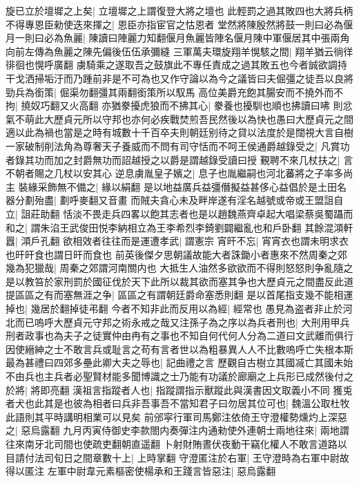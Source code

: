 旋已立於壇墀之上矣|{
	立壇墀之上謂復登大將之壇也}
此輕罰之過其敗四也大將兵柄不得專恩臣勑使迭來揮之|{
	恩臣亦指宦官之怙恩者}
堂然將陳殷然將鼓一則曰必為偃月一則曰必為魚麗|{
	陳讀曰陣麗力知翻偃月魚麗皆陣名偃月陳中軍偃居其中張兩角向前左傳為魚麗之陳先偏後伍伍承彌縫}
三軍萬夫環旋翔羊愰駭之間|{
	翔羊猶云徜徉徘徊也愰呼廣翻}
虜騎乘之遂取吾之鼓旗此不專任責成之過其敗五也今者誠欲調持干戈洒掃垢汙而乃踵前非是不可為也又作守論以為今之議皆曰夫倔彊之徒吾以良將勁兵為銜策|{
	倔渠勿翻彊其兩翻銜策所以馭馬}
高位美爵充飽其腸安而不撓外而不拘|{
	撓奴巧翻又火高翻}
亦猶豢擾虎狼而不拂其心|{
	豢養也擾馴也順也拂讀曰咈}
則忿氣不萌此大歷貞元所以守邦也亦何必疾戰焚煎吾民然後以為快也愚曰大歷貞元之間適以此為禍也當是之時有城數十千百卒夫則朝廷别待之貸以法度於是闊視大言自樹一家破制削法角為尊奢天子養威而不問有司守恬而不呵王侯通爵越錄受之|{
	凡賞功者錄其功而加之封爵無功而詔越授之以爵是謂越錄受讀曰授}
覲聘不來几杖扶之|{
	言不朝者賜之几杖以安其心}
逆息虜胤皇子嬪之|{
	息子也胤繼嗣也河北蕃將之子率多尚主}
裝緣采飾無不備之|{
	緣以絹翻}
是以地益廣兵益彊僭擬益甚侈心益倡於是土田名器分劃殆盡|{
	劃呼麥翻又音畫}
而賊夫貪心未及畔岸遂有淫名越號或帝或王盟詛自立|{
	詛莊助翻}
恬淡不畏走兵四畧以飽其志者也是以趙魏燕齊卓起大唱梁蔡吳蜀躡而和之|{
	謂朱淊王武俊田悦李納相立為王李希烈李錡劉闢繼亂也和戶卧翻}
其餘混澒軒囂|{
	澒戶孔翻}
欲相效者往往而是運遭孝武|{
	謂憲宗}
宵旰不忘|{
	宵宵衣也謂未明求衣也旰旰食也謂日旰而食也}
前英後傑夕思朝議故能大者誅鋤小者惠來不然周秦之郊幾為犯獵哉|{
	周秦之郊謂河南關内也}
大抵生人油然多欲欲而不得則怒怒則争亂隨之是以教笞於家刑罰於國征伐於天下此所以裁其欲而塞其争也大歷貞元之間盡反此道提區區之有而塞無涯之争|{
	區區之有謂朝廷爵命塞悉則翻}
是以首尾指支幾不能相運掉也|{
	幾居於翻掉徒弔翻}
今者不知非此而反用以為經|{
	經常也}
愚見為盗者非止於河北而已嗚呼大歷貞元守邦之術永戒之哉又注孫子為之序以為兵者刑也|{
	大刑用甲兵}
刑者政事也為夫子之徒實仲由冉有之事也不知自何代何人分為二道曰文武離而俱行因使縉紳之士不敢言兵或耻言之苟有言者世以為粗暴異人人不比數嗚呼亡失根本斯最為甚禮曰四郊多壘此卿大夫之辱也|{
	記曲禮之言}
歷觀自古樹立其國㓕亡其國未始不由兵也主兵者必聖賢材能多聞博識之士乃能有功議於廊廟之上兵形已成然後付之於將|{
	將即亮翻}
漢祖言指蹤者人也|{
	指蹤謂指示獸蹤此與漢書因文取義小不同}
獲兎者犬也此其是也彼為相者曰兵非吾事吾不當知君子曰勿居其位可也|{
	魏溫公取杜牧此語則其平時講明相業可以見矣}
前邠寜行軍司馬鄭注依倚王守澄權勢燻灼上深惡之|{
	惡烏露翻}
九月丙寅侍御史李款閤内奏彈注内通勑使外連朝士兩地往來|{
	兩地謂往來南牙北司間也使疏吏翻朝直遥翻}
卜射財賄晝伏夜動干竊化權人不敢言道路以目請付法司旬日之間章數十上|{
	上時掌翻}
守澄匿注於右軍|{
	王守澄時為右軍中尉故得以匿注}
左軍中尉韋元素樞密使楊承和王踐言皆惡注|{
	惡烏露翻}
